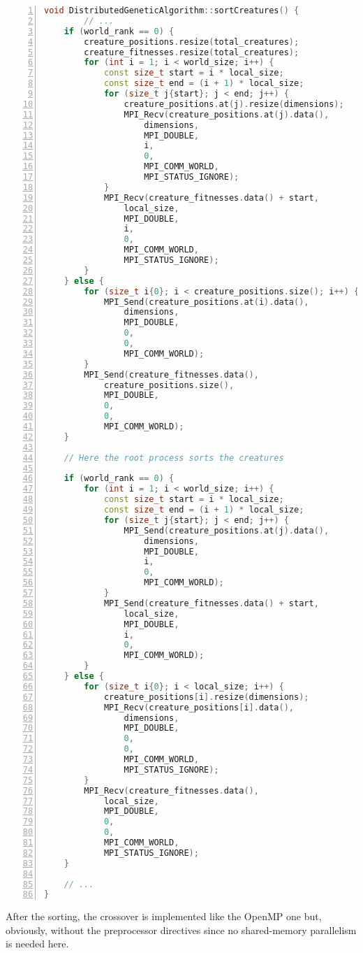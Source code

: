 \documentclass[12pt,a4paper,oneside]{article}
\begin{document}
	\begin{lstlisting}[language=C++,
		directivestyle={\color{black}},
		backgroundcolor=\color{lgrey},
    	basicstyle=\footnotesize \ttfamily \color{black} \bfseries,
		numbers=left,
		numbersep=5pt,
    	numberstyle=\tiny\color{black},
		commentstyle=\color{dkgreen},
    	rulecolor=\color{black},
    	keywordstyle=\color{purple},
    	morekeywords={size_t,std,MPI_Send,MPI_Recv},
		tabsize=2,
    	captionpos=b,
    	caption={Sorting of the population with MPI.},
    	label={listing:mpi_sorting}
	   ]
void DistributedGeneticAlgorithm::sortCreatures() {
		// ...
	if (world_rank == 0) {
		creature_positions.resize(total_creatures);
		creature_fitnesses.resize(total_creatures);
		for (int i = 1; i < world_size; i++) {
			const size_t start = i * local_size;
			const size_t end = (i + 1) * local_size;
			for (size_t j{start}; j < end; j++) {
				creature_positions.at(j).resize(dimensions);
				MPI_Recv(creature_positions.at(j).data(),
					dimensions,
					MPI_DOUBLE,
					i,
					0,
					MPI_COMM_WORLD,
					MPI_STATUS_IGNORE);
			}
			MPI_Recv(creature_fitnesses.data() + start,
				local_size,
				MPI_DOUBLE,
				i,
				0,
				MPI_COMM_WORLD,
				MPI_STATUS_IGNORE);
		}
	} else {
		for (size_t i{0}; i < creature_positions.size(); i++) {
			MPI_Send(creature_positions.at(i).data(),
				dimensions,
				MPI_DOUBLE,
				0,
				0,
				MPI_COMM_WORLD);
		}
		MPI_Send(creature_fitnesses.data(),
			creature_positions.size(),
			MPI_DOUBLE,
			0,
			0,
			MPI_COMM_WORLD);
	}

	// Here the root process sorts the creatures

	if (world_rank == 0) {
		for (int i = 1; i < world_size; i++) {
			const size_t start = i * local_size;
			const size_t end = (i + 1) * local_size;
			for (size_t j{start}; j < end; j++) {
				MPI_Send(creature_positions.at(j).data(),
					dimensions,
					MPI_DOUBLE,
					i,
					0,
					MPI_COMM_WORLD);
			}
			MPI_Send(creature_fitnesses.data() + start,
				local_size,
				MPI_DOUBLE,
				i,
				0,
				MPI_COMM_WORLD);
		}
	} else {
		for (size_t i{0}; i < local_size; i++) {
			creature_positions[i].resize(dimensions);
			MPI_Recv(creature_positions[i].data(),
				dimensions,
				MPI_DOUBLE,
				0,
				0,
				MPI_COMM_WORLD,
				MPI_STATUS_IGNORE);
		}
		MPI_Recv(creature_fitnesses.data(),
			local_size,
			MPI_DOUBLE,
			0,
			0,
			MPI_COMM_WORLD,
			MPI_STATUS_IGNORE);
	}

	// ...
}
	\end{lstlisting}

	After the sorting, the crossover is implemented like the OpenMP one but, obviously, without the preprocessor directives since no shared-memory parallelism is needed here.
	
\end{document}
